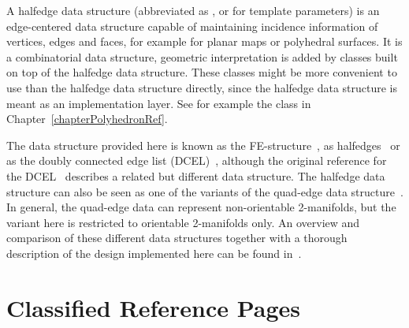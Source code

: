 


A halfedge data structure (abbreviated as , or
 for template parameters) is an edge-centered data structure
capable of maintaining incidence information of vertices, edges and
faces, for example for planar maps or polyhedral surfaces. It is a
combinatorial data structure, geometric interpretation is added by
classes built on top of the halfedge data structure.  These classes
might be more convenient to use than the halfedge data structure
directly, since the halfedge data structure is meant as an
implementation layer.  See for example the 
class in Chapter~\ref{chapterPolyhedronRef}.

The data structure provided here is known as the
FE-structure~\cite{w-ebdss-85}, as
halfedges~\cite{m-ism-88,cgal:bfh-mgedm-95} or as the doubly connected edge
list (DCEL)~\cite{bkos-cgaa-97}, although the original reference for
the DCEL~\cite{mp-fitcp-78} describes a related but different data
structure. The halfedge data structure can also be seen as one of the
variants of the quad-edge data structure~\cite{gs-pmgsc-85}. In
general, the quad-edge data can represent non-orientable 2-manifolds,
but the variant here is restricted to orientable 2-manifolds only. An
overview and comparison of these different data structures together
with a thorough description of the design implemented here can be
found in~\cite{k-ugpdd-99}.


\section{Classified Reference Pages}

